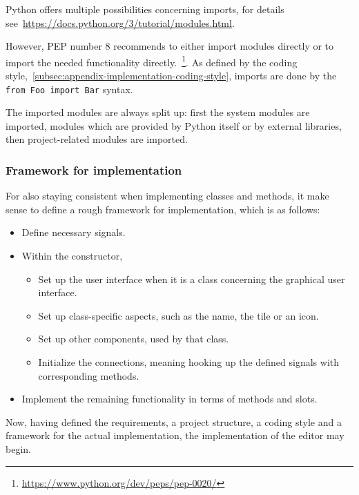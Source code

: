 \documentclass[
    a4paper,      %
    10pt,         %
    openright,    %
    notitlepage,  %
    parskip=half, %
]{scrreprt}       %
\theoremstyle{definition}                    %
\begin{document}
Python offers multiple possibilities concerning imports, for details
see~\url{https://docs.python.org/3/tutorial/modules.html}.

However, PEP number 8 recommends to either import modules directly or to import
the needed functionality
directly.~\footnote{\url{https://www.python.org/dev/peps/pep-0020/}}. As defined
by the coding style,~\autoref{subsec:appendix-implementation-coding-style},
imports are done by the \verb+from Foo import Bar+ syntax.

The imported modules are always split up: first the system modules are imported,
modules which are provided by Python itself or by external libraries, then
project-related modules are imported.

\subsubsection{Framework for implementation}
\label{ssubsec:appendix-implementation-framework}

For also staying consistent when implementing classes and methods, it make sense
to define a rough framework for implementation, which is as follows:

\begin{itemize}
\item Define necessary signals.
\item Within the constructor,
  \begin{itemize}
    \item Set up the user interface when it is a class concerning the graphical user interface.
    \item Set up class-specific aspects, such as the name, the tile or an icon.
    \item Set up other components, used by that class.
    \item Initialize the connections, meaning hooking up the defined signals with
      corresponding methods.
  \end{itemize}
\item Implement the remaining functionality in terms of methods and slots.
\end{itemize}

Now, having defined the requirements, a project structure, a coding style and a
framework for the actual implementation, the implementation of the editor may
begin.

\end{document}
